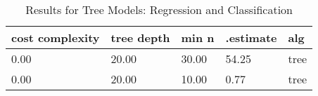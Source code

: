 \documentclass[12pt,english]{article}
\begin{document}
\begin{table}
\caption{Results for Tree Models: Regression and Classification}
\centering
\begin{tabular}[t]{lllll}
\toprule
cost complexity & tree depth & min n & .estimate & alg\\
\midrule
0.00 & 20.00 & 30.00 & 54.25 & tree\\
0.00 & 20.00 & 10.00 & 0.77 & tree\\
\bottomrule
\end{tabular}
\end{table}

\clearpage
\end{document}
